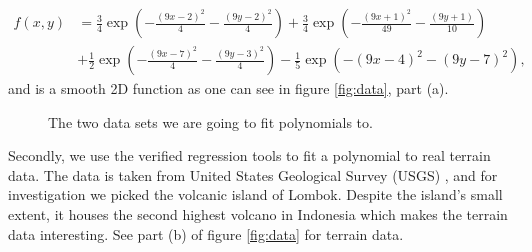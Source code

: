 \begin{align*}
f(x,y) &= \frac{3}{4}\exp{\left(-\frac{(9x-2)^2}{4} - \frac{(9y-2)^2}{4}\right)}+\frac{3}{4}\exp{\left(-\frac{(9x+1)^2}{49}- \frac{(9y+1)}{10}\right)} \\
&+\frac{1}{2}\exp{\left(-\frac{(9x-7)^2}{4} - \frac{(9y-3)^2}{4}\right)} -\frac{1}{5}\exp{\left(-(9x-4)^2 - (9y-7)^2\right) },
\end{align*}
and is a smooth 2D function as one can see in figure \eqref{fig:data}, part (a).

 \begin{figure} [H]%
    \centering
    \caption{The two data sets we are going to fit polynomials to.}%
    \label{fig:data}%
 \end{figure}

Secondly, we use the verified regression tools to fit a polynomial to real terrain data. The data is taken from United States Geological Survey (USGS) \cite{USGS},  and for investigation we picked the volcanic island of Lombok. Despite the island's small extent, it houses the second highest volcano in Indonesia which makes the terrain data interesting. See part (b) of figure \eqref{fig:data} for terrain data.

